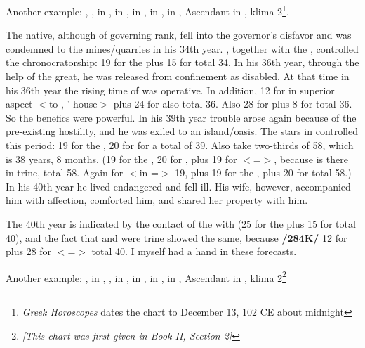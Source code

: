 Another example: \Sun, \Saturn, \Mercury\xspace in \Sagittarius, \Moon\xspace in \Cancer, \Jupiter\xspace in \Taurus, \Mars\xspace in \Leo, \Venus\xspace in \Capricorn, Ascendant in \Virgo, klima 2\footnote{\textit{Greek Horoscopes} dates the chart to December 13, 102 CE about midnight}.

The native, although of governing rank, fell into the governor’s disfavor and was condemned to the mines/quarries in his 34th year. \Mars, together with the \Sun, controlled the chronocratorship: 19 for the \Sun\xspace plus 15 for \Mars\xspace total 34. In his 36th year, through the help of the great, he was released from confinement as disabled. At that time in his 36th year the rising time of \Leo\xspace was operative. In addition, 12 for \Jupiter\xspace in superior aspect $<$to \Scorpio, \Mars’ house$>$ plus 24 for \Taurus also total 36. Also 28 for \Capricorn\xspace plus 8 for \Venus\xspace total 36. So the benefics were powerful. In his 39th year trouble arose again because of the pre-existing hostility, and he was exiled to an island/oasis. The stars in \Sagittarius\xspace controlled this period: 19 for the \Sun, 20 for \Mercury\xspace for a total of 39. Also take two-thirds of 58, which is 38 years, 8 months. (19 for the \Sun, 20 for \Mercury, plus 19 for \Leo $<$=\Sun$>$, because \Mars\xspace is there in trine, total 58. Again for \Mars\xspace $<$in \Leo=\Sun$>$ 19, plus 19 for the \Sun, plus 20 for \Mercury total 58.) In his 40th year he lived endangered and fell ill. His wife, however, accompanied him with affection, comforted him, and shared her property with him. 

The 40th year is indicated by the contact of the \Moon\xspace with \Mars\xspace (25 for the \Moon\xspace plus 15 for \Mars\xspace total 40), and the fact that \Jupiter\xspace and \Venus\xspace were trine showed the same, because \textbf{/284K/} 12 for \Jupiter\xspace plus 28 for \Venus\xspace $<$=\Capricorn$>$ total 40. I myself had a hand in these forecasts.

Another example: \Sun, \Mercury\xspace in \Capricorn, \Moon, \Saturn\xspace in \Sagittarius, \Jupiter\xspace in \Cancer, \Mars\xspace in \Virgo, \Venus\xspace in \Aquarius, Ascendant in \Libra, klima 2\footnote{\textit{[This chart was first given in Book II, Section 2]}}

